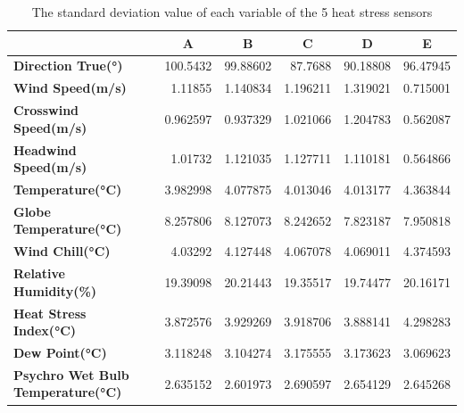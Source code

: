 \documentclass[a4paper]{article}
\begin{document}
\begin{table}[htbp]
\footnotesize
  \centering
  \caption{The standard deviation value of each variable of the 5 heat stress sensors}
    \begin{tabular}{lrrrrr}
    \toprule
          & \multicolumn{1}{c}{\textbf{A }} & \multicolumn{1}{c}{\textbf{B}} & \multicolumn{1}{c}{\textbf{C}} & \multicolumn{1}{c}{\textbf{D}} & \multicolumn{1}{c}{\textbf{E}} \\
    \midrule
    \textbf{Direction True(°)} & \cellcolor[rgb]{ .98,  .502,  .447}100.5432 & 99.88602 & \cellcolor[rgb]{ .608,  .804,  .608}87.7688 & 90.18808 & 96.47945 \\
    \textbf{Wind Speed(m/s)} & 1.11855 & 1.140834 & 1.196211 & \cellcolor[rgb]{ .98,  .502,  .447}1.319021 & \cellcolor[rgb]{ .608,  .804,  .608}0.715001 \\
    \textbf{Crosswind Speed(m/s)} & 0.962597 & 0.937329 & 1.021066 & \cellcolor[rgb]{ .98,  .502,  .447}1.204783 & \cellcolor[rgb]{ .608,  .804,  .608}0.562087 \\
    \textbf{Headwind Speed(m/s)} & 1.01732 & 1.121035 & \cellcolor[rgb]{ .98,  .502,  .447}1.127711 & 1.110181 & \cellcolor[rgb]{ .608,  .804,  .608}0.564866 \\
    \textbf{Temperature(°C)} & 3.982998 & 4.077875 & 4.013046 & 4.013177 & \cellcolor[rgb]{ .98,  .502,  .447}4.363844 \\
    \textbf{Globe Temperature(°C)} & \cellcolor[rgb]{ .98,  .502,  .447}8.257806 & 8.127073 & 8.242652 & \cellcolor[rgb]{ .608,  .804,  .608}7.823187 & 7.950818 \\
    \textbf{Wind Chill(°C)} & \cellcolor[rgb]{ .608,  .804,  .608}4.03292 & 4.127448 & 4.067078 & 4.069011 & \cellcolor[rgb]{ .98,  .502,  .447}4.374593 \\
    \textbf{Relative Humidity(\%)} & 19.39098 & \cellcolor[rgb]{ .98,  .502,  .447}20.21443 & \cellcolor[rgb]{ .608,  .804,  .608}19.35517 & 19.74477 & 20.16171 \\
    \textbf{Heat Stress Index(°C)} & \cellcolor[rgb]{ .608,  .804,  .608}3.872576 & 3.929269 & 3.918706 & 3.888141 & \cellcolor[rgb]{ .98,  .502,  .447}4.298283 \\
    \textbf{Dew Point(°C)} & 3.118248 & 3.104274 & \cellcolor[rgb]{ .98,  .502,  .447}3.175555 & 3.173623 & \cellcolor[rgb]{ .608,  .804,  .608}3.069623 \\
    \textbf{Psychro Wet Bulb Temperature(°C)} & 2.635152 & \cellcolor[rgb]{ .608,  .804,  .608}2.601973 & \cellcolor[rgb]{ .98,  .502,  .447}2.690597 & 2.654129 & 2.645268 \\

\end{tabular}
\end{table}
\end{document}
